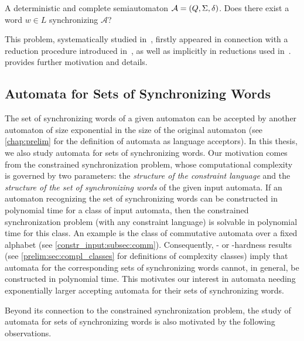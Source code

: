 \begin{center}
\begin{tcolorbox}[width = 0.9\textwidth,colback=white,arc=0pt,outer arc=0pt,boxrule=0.7pt,left =0.5em,right=0em]
{A deterministic and complete semiautomaton $\mathcal A = (Q, \Sigma, \delta)$.}
{Does there exist a word $w \in L$ synchronizing $\mathcal A$?} 
\end{tcolorbox}
\end{center}

This problem, systematically studied in~\cite{FernauGHHVW19},
firstly appeared in connection with a reduction procedure introduced in~\cite{Gusev2012},
as well as implicitly in reductions used in~\cite{Martyugin14}.
 provides further motivation and details.

\subsection{Automata for Sets of Synchronizing Words}
\label{intro:overview:structure_set_of_sync_words}

The set of synchronizing words of a given automaton can be accepted by another automaton of size exponential in the size of the original automaton (see \cref{chap:prelim} for the definition of automata as language acceptors). In this thesis, we also study automata for sets of synchronizing words.
Our motivation comes from the constrained synchronization problem, whose computational complexity is governed by two parameters: the \emph{structure of the constraint language} and the \emph{structure of the set of synchronizing words} of the given input automata.
If an automaton recognizing the set of synchronizing words can be constructed in polynomial time for a class of input automata, then the constrained synchronization problem (with any constraint language) is solvable in polynomial time for this class. An example is the class of commutative automata over a fixed alphabet (see \cref{constr_input:subsec:comm}).
Consequently, \NP- or \PSPACE-hardness results (see \cref{prelim:sec:compl_classes} for definitions of complexity classes) imply that automata for the corresponding sets of synchronizing words cannot, in general, be constructed in polynomial time. 
This motivates our interest in automata 
needing exponentially larger accepting automata for their sets of synchronizing words.

Beyond its connection to the constrained synchronization problem, the study of automata for sets of synchronizing words is also motivated by the following observations.

